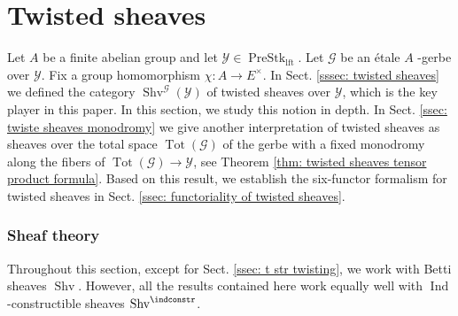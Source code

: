 \documentclass[10pt]{amsart}
\newcommand{\sssec}{\subsubsection}
\theoremstyle{remark}
\newcommand{\mc}[1]{\mathcal{#1}}
\newcommand{\on}{\operatorname}
\newcommand{\cG}{\mathcal{G}}
\newcommand{\cY}{\mathcal{Y}}
\newcommand{\Shv}{\on{Shv}}
\newcommand{\PreStklft}{\on{PreStk}_{\on{lft}}}
\DeclareMathOperator{\Ind}{Ind}
\begin{document}
\section{Twisted sheaves}\label{sec: twisted sheaves}
Let $A$ be a finite abelian group and let $\cY\in \PreStklft$. Let $\mc{G}$ be an \'etale $A$
-gerbe over $\cY$. Fix a group homomorphism $\chi: A\rightarrow E^{\times}$. In Sect. \ref{sssec: twisted sheaves} we defined the category $\Shv^{\cG}(\cY)$ of twisted sheaves over $\cY$, which is the key player in this paper. In this section, we study this notion in depth. In Sect. \ref{ssec: twiste sheaves monodromy} we give another interpretation of twisted sheaves as sheaves over the total space $\on{Tot}(\cG)$ of the gerbe with a fixed monodromy along the fibers of $\on{Tot}(\cG)\rightarrow \cY$, see Theorem \ref{thm: twisted sheaves tensor product formula}. Based on this result, we establish the six-functor formalism for twisted sheaves in Sect. \ref{ssec: functoriality of twisted sheaves}.

\sssec{Sheaf theory}\label{sssec: six functor extension} Throughout this section, except for Sect. \ref{ssec: t str twisting}, we work with Betti sheaves $\Shv$. However, all the results contained here work equally well with $\Ind$-constructible sheaves $\Shv^{\indconstr}$.
\end{document}
